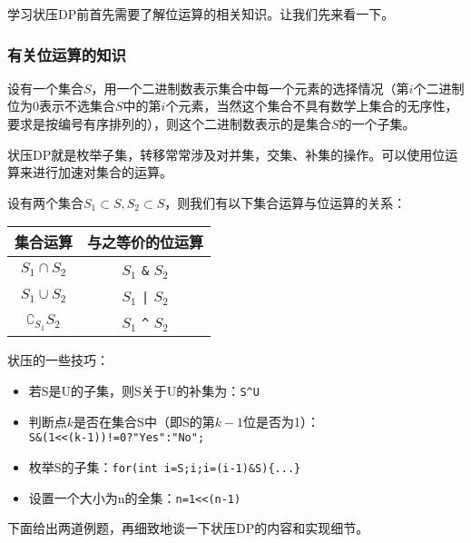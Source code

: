 学习状压DP前首先需要了解位运算的相关知识。让我们先来看一下。
\subsubsection{有关位运算的知识}
设有一个集合$S$，用一个二进制数表示集合中每一个元素的选择情况（第$i$个二进制位为0表示不选集合$S$中的第$i$个元素，当然这个集合不具有数学上集合的无序性，要求是按编号有序排列的），则这个二进制数表示的是集合$S$的一个子集。

状压DP就是枚举子集，转移常常涉及对并集，交集、补集的操作。可以使用位运算来进行加速对集合的运算。

设有两个集合$S_1\subset S, S_2\subset S$，则我们有以下集合运算与位运算的关系：

\begin{center}
	\begin{tabular}{|c|c|}
		\hline
		集合运算               & 与之等价的位运算                   \\
		\hline
		$S_1\cap S_2$          & $S_1$ \verb+&+ $S_2$ \\
		\hline
		$S_1\cup S_2$          & $S_1$ \verb+|+ $S_2$ \\
		\hline
		$\complement_{S_1}S_2$ & $S_1$ \verb+^+ $S_2$ \\
		\hline
	\end{tabular}
\end{center}

状压的一些技巧：
\begin{itemize}
	\item{若S是U的子集，则S关于U的补集为：\verb$S^U$}
	\item{判断点$k$是否在集合S中（即S的第$k- 1$位是否为1）：\\\verb$S&(1<<(k-1))!=0?"Yes":"No";$}
	\item{枚举S的子集：\verb$for(int i=S;i;i=(i-1)&S){...}$}
	\item{设置一个大小为n的全集：\verb$n=1<<(n-1)$}
\end{itemize}

下面给出两道例题，再细致地谈一下状压DP的内容和实现细节。

